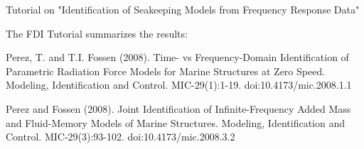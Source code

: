 Tutorial on "Identification of Seakeeping Models from Frequency Response Data"


The FDI Tutorial summarizes the results:

Perez, T. and T.I. Fossen (2008). Time- vs Frequency-Domain Identification of Parametric Radiation Force Models for Marine
Structures at Zero Speed. Modeling, Identification and Control. MIC-29(1):1-19. doi:10.4173/mic.2008.1.1

Perez and Fossen (2008). Joint Identification of Infinite-Frequency Added Mass and Fluid-Memory Models of Marine Structures.
Modeling, Identification and Control. MIC-29(3):93-102. doi:10.4173/mic.2008.3.2